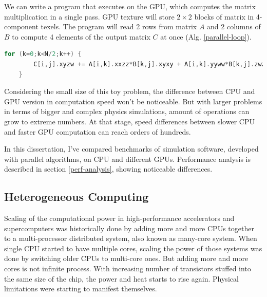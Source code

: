 We can write a program that executes on the GPU, which computes the matrix multiplication in a single pass. GPU texture will store $2 \times 2$ blocks of matrix in 4-component texels. The program will read 2 rows from matrix $A$ and 2 columns of $B$ to compute 4 elements of the output matrix $C$ at once (Alg. \ref{parallel-loop}).

\begin{lstlisting}[language=Cpp, caption=Pseudocode with serial loop., label=parallel-loop]
	for (k=0;k<N/2;k++) {
		C[i,j].xyzw += A[i,k].xxzz*B[k,j].xyxy + A[i,k].yyww*B[k,j].zwzw;
	}
\end{lstlisting}

Considering the small size of this toy problem, the difference between CPU and GPU version in computation speed won't be noticeable. But with larger problems in terms of bigger and complex physics simulations, amount of operations can grow to extreme numbers. At that stage, speed differences between slower CPU and faster GPU computation can reach orders of hundreds.

In this dissertation, I've compared benchmarks of simulation software, developed with parallel algorithms, on CPU and different GPUs. Performance analysis is described in section \ref{perf-analysis}, showing noticeable differences.

%
%
%
%
%



\subsection{Heterogeneous Computing}
Scaling of the computational power in high-performance accelerators and supercomputers was historically done by adding more and more CPUs together to a multi-processor distributed system, also known as many-core system. When single CPU started to have multiple cores, scaling the power of those systems was done by switching older CPUs to multi-core ones. But adding more and more cores is not infinite process. With increasing number of transistors stuffed into the same size of the chip, the power and heat starts to rise again. Physical limitations were starting to manifest themselves.

